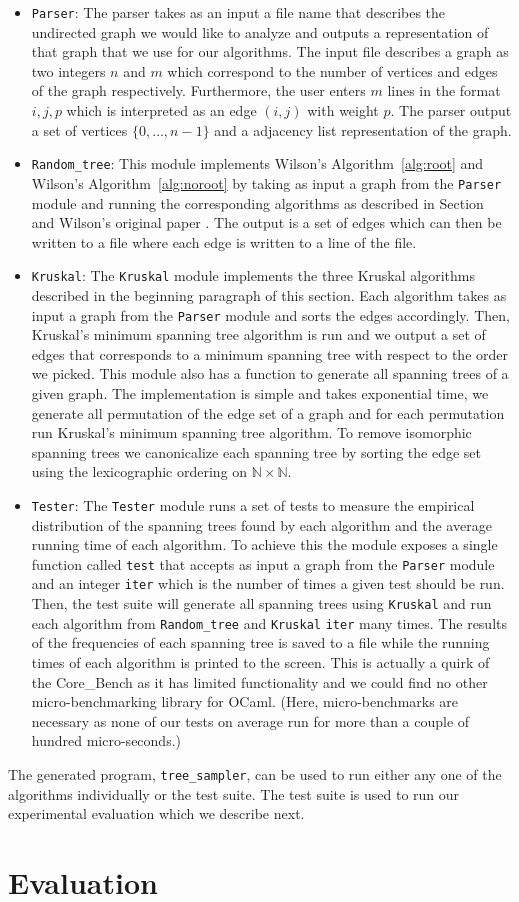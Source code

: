 \documentclass[11pt]{article}
\begin{document}
\begin{itemize}
\item \texttt{Parser}: The parser takes as an input a file name that describes the undirected graph we would like to analyze and outputs a representation of that graph that we use for our algorithms. The input file describes a graph as two integers $n$ and $m$ which correspond to the number of vertices and edges of the graph respectively. Furthermore, the user enters $m$ lines in the format $i,j,p$ which is interpreted as an edge $(i,j)$ with weight $p$. The parser output a set of vertices $\{0,\dots,n-1\}$ and a adjacency list representation of the graph.
\item \texttt{Random\_tree}: This module implements Wilson's Algorithm~\ref{alg:root} and Wilson's Algorithm~\ref{alg:noroot} by taking as input a graph from the \texttt{Parser} module and running the corresponding algorithms as described in Section~\label{wilson} and Wilson's original paper \cite{wilson}. The output is a set of edges which can then be written to a file where each edge is written to a line of the file.
\item \texttt{Kruskal}: The \texttt{Kruskal} module implements the three Kruskal algorithms described in the beginning paragraph of this section. Each algorithm takes as input a graph from the \texttt{Parser} module and sorts the edges accordingly. Then, Kruskal's minimum spanning tree algorithm is run and we output a set of edges that corresponds to a minimum spanning tree with respect to the order we picked. This module also has a function to generate all spanning trees of a given graph. The implementation is simple and takes exponential time, we generate all permutation of the edge set of a graph and for each permutation run Kruskal's minimum spanning tree algorithm. To remove isomorphic spanning trees we canonicalize each spanning tree by sorting the edge set using the lexicographic ordering on $\mathbb{N}\times\mathbb{N}$.
\item \texttt{Tester}: The \texttt{Tester} module runs a set of tests to measure the empirical distribution of the spanning trees found by each algorithm and the average running time of each algorithm. To achieve this the module exposes a single function called \texttt{test} that accepts as input a graph from the \texttt{Parser} module and an integer \texttt{iter} which is the number of times a given test should be run. Then, the test suite will generate all spanning trees using \texttt{Kruskal} and run each algorithm from \texttt{Random\_tree} and \texttt{Kruskal} \texttt{iter} many times. The results of the frequencies of each spanning tree is saved to a file while the running times of each algorithm is printed to the screen. This is actually a quirk of the Core\_Bench as it has limited functionality and we could find no other micro-benchmarking library for OCaml. (Here, micro-benchmarks are necessary as none of our tests on average run for more than a couple of hundred micro-seconds.)
\end{itemize}

The generated program, \texttt{tree\_sampler}, can be used to run either any one of the algorithms individually or the test suite. The test suite is used to run our experimental evaluation which we describe next.

\section{Evaluation}\label{eval}



\printbibliography
\end{document}
